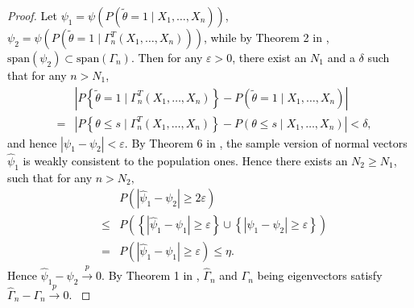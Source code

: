 \begin{proof}
\textcolor{black}{Let $\psi_{1}=\psi\left(P\left(\tilde{\theta}=1\mid X_{1},\ldots,X_{n}\right)\right)$,
$\psi_{2}=\psi\left(P\left(\tilde{\theta}=1\mid\Gamma_{n}^{T}\left(X_{1},\ldots,X_{n}\right)\right)\right)$,
while by Theorem 2 in \cite{li2011principal}, $\mathrm{span}\left(\psi_{2}\right)\subset\mathrm{span}\left(\Gamma_{n}\right)$.
Then for any $\varepsilon>0$, there exist an $N_{1}$ and a $\delta$
such that for any $n>N_{1}$, 
\begin{eqnarray*}
 &  & \left|P\left\{ \tilde{\theta}=1\mid\Gamma_{n}^{T}\left(X_{1},\ldots,X_{n}\right)\right\} -P\left(\tilde{\theta}=1\mid X_{1},\ldots,X_{n}\right)\right|\\
 & = & \left|P\left\{ \theta\le s\mid\Gamma_{n}^{T}\left(X_{1},\ldots,X_{n}\right)\right\} -P\left(\theta\le s\mid X_{1},\ldots,X_{n}\right)\right|<\delta,
\end{eqnarray*}
and hence $\left|\psi_{1}-\psi_{2}\right|<\varepsilon$. By Theorem
6 in \cite{li2011principal}, the sample version of normal vectors
$\hat{\psi}_{1}$ is weakly consistent to the population ones. Hence
there exists an $N_{2}\ge N_{1}$, such that for any $n>N_{2},$
\begin{eqnarray*}
 &  & P\left(\left|\hat{\psi}_{1}-\psi_{2}\right|\ge2\varepsilon\right)\\
 & \le & P\left(\left\{ \left|\hat{\psi}_{1}-\psi_{1}\right|\ge\varepsilon\right\} \cup\left\{ \left|\psi_{1}-\psi_{2}\right|\ge\varepsilon\right\} \right)\\
 & = & P\left(\left|\hat{\psi}_{1}-\psi_{1}\right|\ge\varepsilon\right)\le\eta.
\end{eqnarray*}
Hence $\hat{\psi}_{1}-\psi_{2}\overset{p}{\rightarrow}0.$ By Theorem
1 in \cite{bura2008distribution}, $\hat{\Gamma}_{n}$ and $\Gamma_{n}$
being eigenvectors satisfy $\hat{\Gamma}_{n}-\Gamma_{n}\overset{p}{\rightarrow}0$. }
\end{proof}